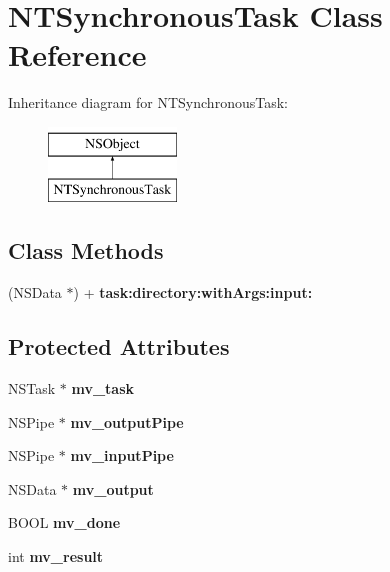 \hypertarget{interface_n_t_synchronous_task}{}\section{N\+T\+Synchronous\+Task Class Reference}
\label{interface_n_t_synchronous_task}
Inheritance diagram for N\+T\+Synchronous\+Task\+:\begin{figure}[H]
\begin{center}
\leavevmode
\includegraphics[height=2.000000cm]{interface_n_t_synchronous_task}
\end{center}
\end{figure}
\subsection*{Class Methods}
\begin{DoxyCompactItemize}
\item 
\mbox{\label{interface_n_t_synchronous_task_adad10358dfee7b9100cc2b680cefc113}} 
(N\+S\+Data $\ast$) + {\bfseries task\+:directory\+:with\+Args\+:input\+:}
\end{DoxyCompactItemize}
\subsection*{Protected Attributes}
\begin{DoxyCompactItemize}
\item 
\mbox{\label{interface_n_t_synchronous_task_acc0565c7cdccba27e0aaa550b2037bc2}} 
N\+S\+Task $\ast$ {\bfseries mv\+\_\+task}
\item 
\mbox{\label{interface_n_t_synchronous_task_a0c6d400e524814c89a29721f77e1a76f}} 
N\+S\+Pipe $\ast$ {\bfseries mv\+\_\+output\+Pipe}
\item 
\mbox{\label{interface_n_t_synchronous_task_a2e4f2e676e8558a84d046a905d2d8530}} 
N\+S\+Pipe $\ast$ {\bfseries mv\+\_\+input\+Pipe}
\item 
\mbox{\label{interface_n_t_synchronous_task_a2528ce6e6a0554062ebd0ef7241d530b}} 
N\+S\+Data $\ast$ {\bfseries mv\+\_\+output}
\item 
\mbox{\label{interface_n_t_synchronous_task_aa76b62b858e7f34936c902f83be3cf8b}} 
B\+O\+OL {\bfseries mv\+\_\+done}
\item 
\mbox{\label{interface_n_t_synchronous_task_ab969a73e942f4f652afb05a1ae18a8d1}} 
int {\bfseries mv\+\_\+result}
\end{DoxyCompactItemize}


